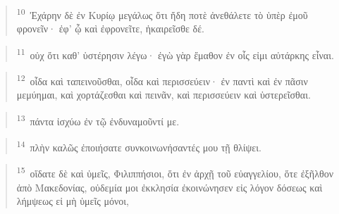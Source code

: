 \documentclass{article}
\newcommand{\currentverse}{1} %
\newcommand{\setcurrentverse}[1]{\renewcommand{\currentverse}{#1}}
\begin{document}
\begin{verse}

\setcurrentverse{10}

\setcounter{footnote}{0}

\textsuperscript{10}~Ἐχάρην δὲ ἐν Κυρίῳ μεγάλως ὅτι ἤδη ποτὲ ἀνεθάλετε τὸ ὑπὲρ ἐμοῦ φρονεῖν· ἐφ’ ᾧ καὶ ἐφρονεῖτε, ἠκαιρεῖσθε δέ.

\end{verse}

\begin{verse}

\setcurrentverse{11}

\setcounter{footnote}{0}

\textsuperscript{11}~οὐχ ὅτι καθ’ ὑστέρησιν λέγω· ἐγὼ γὰρ ἔμαθον ἐν οἷς εἰμι αὐτάρκης εἶναι.

\end{verse}

\begin{verse}

\setcurrentverse{12}

\setcounter{footnote}{0}

\textsuperscript{12}~οἶδα καὶ ταπεινοῦσθαι, οἶδα καὶ περισσεύειν· ἐν παντὶ καὶ ἐν πᾶσιν μεμύημαι, καὶ χορτάζεσθαι καὶ πεινᾶν, καὶ περισσεύειν καὶ ὑστερεῖσθαι.

\end{verse}

\begin{verse}

\setcurrentverse{13}

\setcounter{footnote}{0}

\textsuperscript{13}~πάντα ἰσχύω ἐν τῷ ἐνδυναμοῦντί με.

\end{verse}

\begin{verse}

\setcurrentverse{14}

\setcounter{footnote}{0}

\textsuperscript{14}~πλὴν καλῶς ἐποιήσατε συνκοινωνήσαντές μου τῇ θλίψει.

\end{verse}

\begin{verse}

\setcurrentverse{15}

\setcounter{footnote}{0}

\textsuperscript{15}~οἴδατε δὲ καὶ ὑμεῖς, Φιλιππήσιοι, ὅτι ἐν ἀρχῇ τοῦ εὐαγγελίου, ὅτε ἐξῆλθον ἀπὸ Μακεδονίας, οὐδεμία μοι ἐκκλησία ἐκοινώνησεν εἰς λόγον δόσεως καὶ λήμψεως εἰ μὴ ὑμεῖς μόνοι,

\end{verse}
\end{document}
